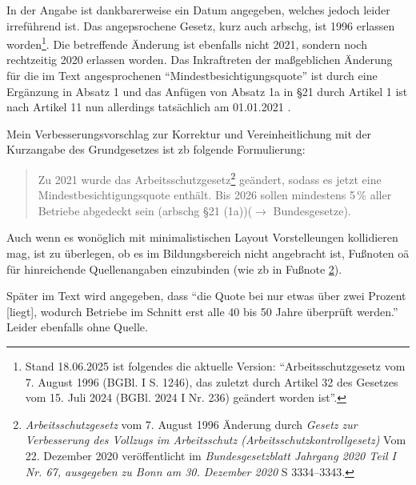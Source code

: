 In der Angabe ist dankbarerweise ein Datum angegeben, welches jedoch leider irreführend ist. Das angepsrochene Gesetz, kurz auch \gls{arbschg}, ist 1996 erlassen worden\footnote{Stand 18.06.2025 ist folgendes die aktuelle Version: \enquote{Arbeitsschutzgesetz vom 7. August 1996 (BGBl. I S. 1246), das zuletzt durch Artikel 32 des Gesetzes vom 15. Juli 2024 (BGBl. 2024 I Nr. 236) geändert worden ist}.}. Die betreffende Änderung ist ebenfalls nicht 2021, sondern noch rechtzeitig 2020 erlassen worden. Das Inkraftreten der maßgeblichen Änderung für die im Text angesprochenen \enquote{Mindestbesichtigungsquote} ist durch eine Ergänzung in Absatz 1 und das Anfügen von Absatz 1a in §21 %
durch Artikel 1 ist nach Artikel 11 nun allerdings tatsächlich am 01.01.2021 \autocite[3334–3343]{BGBl.2020-I-Nr67}. 

Mein Verbesserungsvorschlag zur Korrektur und Vereinheitlichung mit der Kurzangabe des Grundgesetzes ist \gls{zb} folgende Formulierung:
\begin{quote}
Zu 2021 wurde das Arbeitsschutzgesetz\footnote{
    \emph{Arbeitsschutzgesetz} vom 7. August 1996 Änderung durch \emph{Gesetz zur Verbesserung des Vollzugs im Arbeitsschutz (Arbeitsschutzkontrollgesetz)} Vom 22. Dezember 2020 veröffentlicht im \emph{Bundesgesetzblatt Jahrgang 2020 Teil I Nr. 67, ausgegeben zu Bonn am 30. Dezember 2020} \gls{S} 3334–3343.\label{ArbschSchGfooty}} 
    geändert, sodass es jetzt eine Mindestbesichtigungsquote enthält. %
    Bis 2026 sollen mindestens 5\,\% aller Betriebe abgedeckt sein (\gls{arbschg} §21 (1a))($\rightarrow$ Bundesgesetze). 
\end{quote}

Auch wenn es wonöglich mit minimalistischen Layout Vorstelleungen kollidieren mag, ist zu überlegen, ob es im Bildungsbereich nicht angebracht ist, Fußnoten \gls{oä} für hinreichende Quellenangaben einzubinden (wie \gls{zb} in Fußnote \ref{ArbschSchGfooty}). 


Später im Text wird angegeben, dass \enquote{die Quote bei nur etwas über zwei Prozent [liegt], wodurch Betriebe im Schnitt erst alle 40 bis 50 Jahre überprüft werden.} Leider ebenfalls ohne Quelle.



